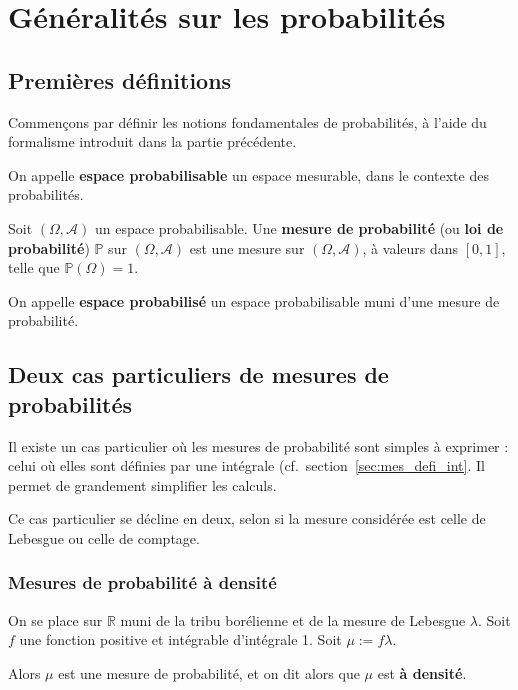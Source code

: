 \documentclass[../integ-proba.tex]{subfiles}
\begin{document}
    \chapter{Généralités sur les probabilités}

    \section{Premières définitions}

    Commençons par définir les notions fondamentales de probabilités, à l'aide du formalisme introduit dans la partie précédente.

    \begin{defi}
        On appelle \textbf{espace probabilisable} un espace mesurable, dans le contexte des probabilités.
    \end{defi}

    \begin{defi}
        Soit $\left(\Omega, \mathcal{A}\right)$ un espace probabilisable.
        Une \textbf{mesure de probabilité} (ou \textbf{loi de probabilité}) $\mathbb{P}$ sur $\left(\Omega, \mathcal{A}\right)$ est une mesure sur $\left(\Omega, \mathcal{A}\right)$, à valeurs dans $\left[0,1\right]$, telle que $\mathbb{P}\left(\Omega\right)=1$.
    \end{defi}

    \begin{defi}
        On appelle \textbf{espace probabilisé} un espace probabilisable muni d'une mesure de probabilité.
    \end{defi}

    \section{Deux cas particuliers de mesures de probabilités}

    Il existe un cas particulier où les mesures de probabilité sont simples à exprimer : celui où elles sont définies par une intégrale (cf.\ section~\ref{sec:mes_defi_int}.
    Il permet de grandement simplifier les calculs.

    Ce cas particulier se décline en deux, selon si la mesure considérée est celle de Lebesgue ou celle de comptage.

        \subsection{Mesures de probabilité à densité}
            \begin{defi}
                On se place sur $\mathbb{R}$ muni de la tribu borélienne et de la mesure de Lebesgue $\lambda$.
                Soit $f$ une fonction positive et intégrable d'intégrale 1.
                Soit $\mu:=f \lambda$.

                Alors $\mu$ est une mesure de probabilité, et on dit alors que $\mu$ est \textbf{à densité}.
            \end{defi}
\end{document}
